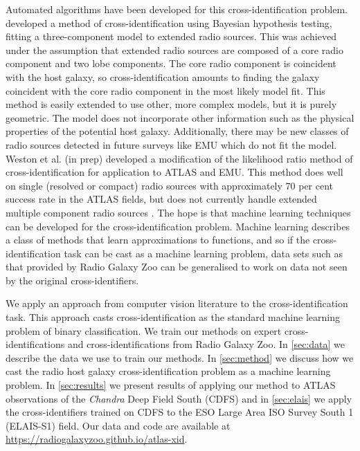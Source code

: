 \documentclass[fleqn,usenatbib,usedcolumn]{mnras}
\begin{document}
  Automated algorithms have been developed for this cross-identification
  problem. \citet{fan15} developed a method of cross-identification using
  Bayesian hypothesis testing, fitting a three-component model to extended
  radio sources. This was achieved under the assumption that extended radio
  sources are composed of a core radio component and two lobe components. The
  core radio component is coincident with the host galaxy, so
  cross-identification amounts to finding the galaxy coincident with the core
  radio component in the most likely model fit. This method is easily extended
  to use other, more complex models, but it is purely geometric. The model
  does not incorporate other information such as the physical properties of
  the potential host galaxy. Additionally, there may be new classes of radio
  sources detected in future surveys like EMU which do not fit the model.
  Weston et al. (in prep) developed a modification of the likelihood ratio method of
  cross-identification \citep{richter75likelihood} for application to ATLAS
  and EMU. This method does well on single (resolved or compact) radio sources
  with approximately 70 per cent success rate in the ATLAS fields, but does
  not currently handle extended multiple component radio sources
  \citep{norris17unexpected}. The hope is that machine learning techniques can
  be developed for the cross-identification problem. Machine learning
  describes a class of methods that learn approximations to functions, and so
  if the cross-identification task can be cast as a machine learning problem,
  data sets such as that provided by Radio Galaxy Zoo can be generalised to
  work on data not seen by the original cross-identifiers.

  We apply an approach from computer vision literature to the
  cross-identification task. This approach casts cross-identification as the
  standard machine learning problem of binary classification. We train our
  methods on expert cross-identifications and cross-identifications from Radio
  Galaxy Zoo. In \autoref{sec:data} we describe the data we use to train our
  methods. In \autoref{sec:method} we discuss how we cast the radio host
  galaxy cross-identification problem as a machine learning problem. In
  \autoref{sec:results} we present results of applying our method to ATLAS
  observations of the \emph{Chandra} Deep Field South (CDFS) and in
  \autoref{sec:elais} we apply the cross-identifiers trained on CDFS to the
  ESO Large Area ISO Survey South 1 (ELAIS-S1) field. Our data and code are
  available at \url{https://radiogalaxyzoo.github.io/atlas-xid}.
\end{document}

